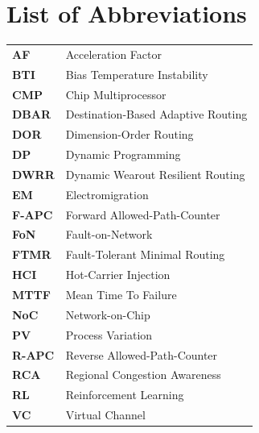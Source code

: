 \chapter{List of Abbreviations}

\def\arraystretch{1.5}
\begin{longtable}[l]{l l}
    \textbf{AF} & Acceleration Factor\\
    \textbf{BTI} & Bias Temperature Instability\\
    \textbf{CMP} & Chip Multiprocessor\\
    \textbf{DBAR} & Destination-Based Adaptive Routing\\
    \textbf{DOR} & Dimension-Order Routing\\
    \textbf{DP} & Dynamic Programming\\
    \textbf{DWRR} & Dynamic Wearout Resilient Routing\\
    \textbf{EM} & Electromigration\\
    \textbf{F-APC} & Forward Allowed-Path-Counter\\
    \textbf{FoN} & Fault-on-Network\\
    \textbf{FTMR} & Fault-Tolerant Minimal Routing\\
    \textbf{HCI} & Hot-Carrier Injection\\
    \textbf{MTTF} & Mean Time To Failure\\
    \textbf{NoC} & Network-on-Chip\\
    \textbf{PV} & Process Variation\\
    \textbf{R-APC} & Reverse Allowed-Path-Counter\\
    \textbf{RCA} & Regional Congestion Awareness\\
    \textbf{RL} & Reinforcement Learning\\
    \textbf{VC} & Virtual Channel\\
\end{longtable}
\def\arraystretch{1}
